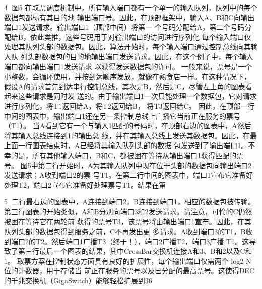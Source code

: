                                                     4
图5 在取票调度机制中，所有输入端口都有一个单一的输入队列，队列中的每个数据包都标有其目的地
输出端口号。因此，在顶部框架中，输入A、B和C向输出端口1发送请求。输出端口1（顶部中间）将第一
个号码分配给A，第二个号码分配给B，依此类推，这些号码用于对输出端口的访问进行序列化
每个输入端口仅处理其队列头部的数据包。因此，算法开始时，每个输入端口通过控制总线向其输入队
列头部数据包的目的地输出端口发送请求。因此，在这个例子中，每个输入端口都向输出端口1发送请求
以获得发送数据包的许可。
一般来说，票号是一个小整数，会循环使用，并按到达顺序发放，就像在熟食店一样。在这种情况下，
假设A的请求首先到达串行控制总线，其次是B，然后是C，尽管左上角的图表看起来这些请求是同时发
送的。由于输出端口1一次只能处理一个数据包，它对请求进行序列化，将T1返回给A，将T2返回给B，
将T3返回给C。
因此，在顶部一行中间的图表中，输出端口1还在另一条控制总线上广播它当前正在服务的票号（T1）。
当A看到它有一个与输入1匹配的号码时，在顶部右边的图表中，A然后将其输入总线连接到1的输出总
线，并在其输入总线上发送其数据包。因此，在最上面一行图表结束时，A已经将其输入队列头部的数据
包发送到了输出端口1。不幸的是，所有其他输入端口，B和C，都被困在等待从输出端口1获得匹配的票
号。
图5中第二行开始时，A为其输入队列中现在位于头部的数据包向输出端口2发送请求；A收到端口2的票
号T1。在第二行中间的图表中，端口1宣布它准备好处理T2，端口2宣布它准备好处理票号T1。结果在第

                                                5
二行最右边的图表中，A连接到端口2，B连接到端口1，相应的数据包被传输。
第三行图表的开始类似，A和B分别向端口3和2发送请求。请注意，可怜的C仍然被困在等待它在两轮前
获得的票号T3，该票号将由输出端口1宣布。因此，在其队列头部的数据包得到服务之前，C不再发出更
多请求。A收到端口3的T1，B收到端口2的T2。然后端口1广播T3（终于！），端口2广播T2，端口3广播
T1。这导致了第三行最后一个图表的结果，其中CrossBar交换机连接A和3、B和2以及C和1。
取票方案在控制状态方面具有良好的扩展性，每个输出端口仅需两个 log2 N 位的计数器，用于存储当
前正在服务的票号以及已分配的最高票号。这使得DEC的千兆交换机（GigaSwitch）能够轻松扩展到36
                                    ​




